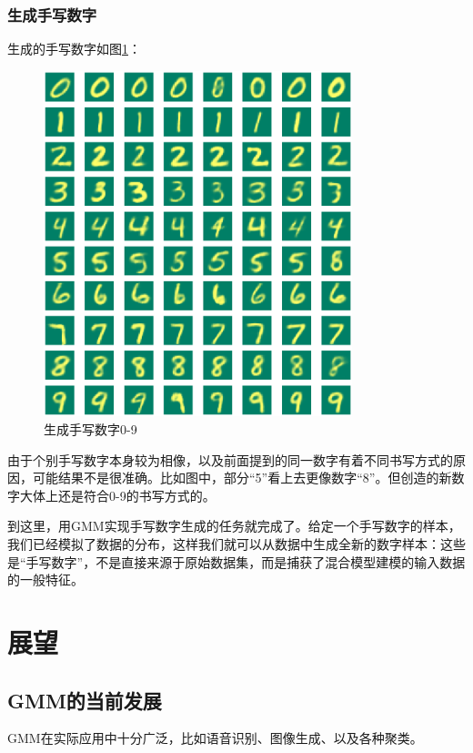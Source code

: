 \documentclass[UTF8]{ctexart}
\begin{document}
\subsubsection{生成手写数字}
生成的手写数字如图\ref{gen_digit}：
\begin{figure}[!h]
	\centering
	\includegraphics[width=0.8\textwidth]{./figures/gen0-9.png}
	\caption{生成手写数字0-9}
	\label{gen_digit}
\end{figure}

由于个别手写数字本身较为相像，以及前面提到的同一数字有着不同书写方式的原因，可能结果不是很准确。比如图中，部分“5”看上去更像数字“8”。但创造的新数字大体上还是符合0-9的书写方式的。

到这里，用GMM实现手写数字生成的任务就完成了。给定一个手写数字的样本，我们已经模拟了数据的分布，这样我们就可以从数据中生成全新的数字样本：这些是“手写数字”，不是直接来源于原始数据集，而是捕获了混合模型建模的输入数据的一般特征。

\section{展望}

\subsection{GMM的当前发展}

GMM在实际应用中十分广泛，比如语音识别、图像生成、以及各种聚类。
\end{document}

